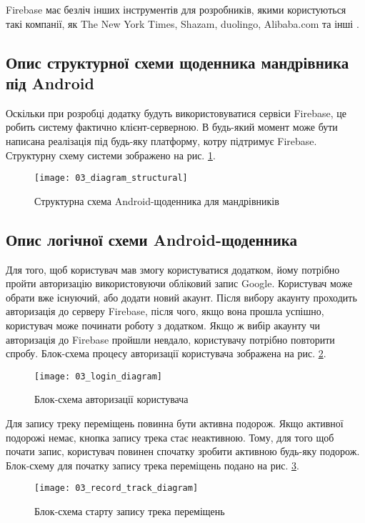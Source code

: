 \documentclass[../main.tex]{subfiles}
\begin{document}
Firebase має безліч інших інструментів для розробників, якими користуються такі компанії, як The New York Times, Shazam, duolingo, Alibaba.com та інші \cite{firebase}.

\subsection{Опис структурної схеми щоденника мандрівника під Android}
Оскільки при розробці додатку будуть використовуватися сервіси Firebase, це робить систему фактично клієнт-серверною. В будь-який момент може бути написана реалізація під будь-яку платформу, котру підтримує Firebase. Структурну схему системи зображено на рис. \ref{diagram:structural}.

\begin{figure}[H]
	\centering
	\texttt{[image: 03\_diagram\_structural]}
	\caption{Структурна схема Android-щоденника для мандрівників}
	\label{diagram:structural}
\end{figure}

\subsection{Опис логічної схеми Android-щоденника}
Для того, щоб користувач мав змогу користуватися додатком, йому потрібно пройти авторизацію використовуючи обліковий запис Google. Користувач може обрати вже існуючий, або додати новий акаунт. Після вибору акаунту проходить авторизація до серверу Firebase, після чого, якщо вона прошла успішно, користувач може починати роботу з додатком. Якщо ж вибір акаунту чи авторизація до Firebase пройшли невдало, користувачу потрібно повторити спробу. Блок-схема процесу авторизації користувача зображена на рис. \ref{diagram:login}.

\begin{figure}[H]
	\centering
	\texttt{[image: 03\_login\_diagram]}
	\caption{Блок-схема авторизації користувача}
	\label{diagram:login}
\end{figure}

Для запису треку переміщень повинна бути активна подорож. Якщо активної подорожі немає, кнопка запису трека стає неактивною. Тому, для того щоб почати запис, користувач повинен спочатку зробити активною будь-яку подорож. Блок-схему для початку запису трека переміщень подано на рис. \ref{diagram:start_tracking}.

\begin{figure}[H]
	\centering
	\texttt{[image: 03\_record\_track\_diagram]}
	\caption{Блок-схема старту запису трека переміщень}
	\label{diagram:start_tracking}
\end{figure}
\end{document}
